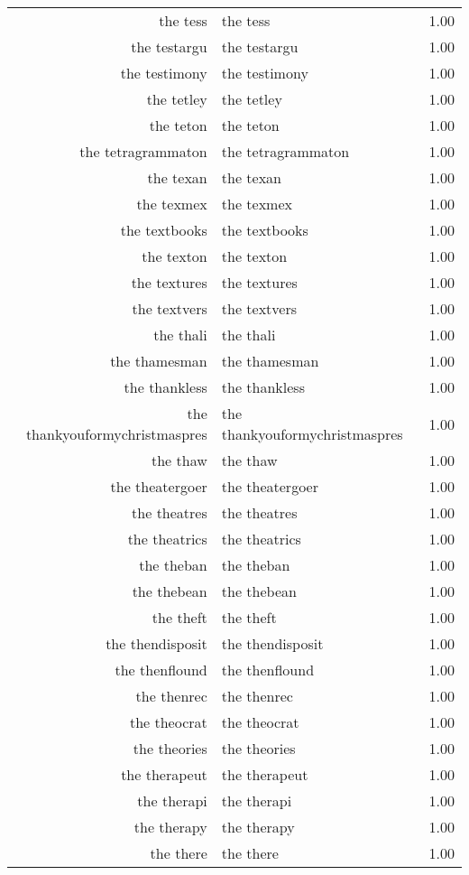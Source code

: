 \begin{table}[ht]
\begin{tabular}{rlr}
  the tess & the tess & 1.00 \\ 
  the testargu & the testargu & 1.00 \\ 
  the testimony & the testimony & 1.00 \\ 
  the tetley & the tetley & 1.00 \\ 
  the teton & the teton & 1.00 \\ 
  the tetragrammaton & the tetragrammaton & 1.00 \\ 
  the texan & the texan & 1.00 \\ 
  the texmex & the texmex & 1.00 \\ 
  the textbooks & the textbooks & 1.00 \\ 
  the texton & the texton & 1.00 \\ 
  the textures & the textures & 1.00 \\ 
  the textvers & the textvers & 1.00 \\ 
  the thali & the thali & 1.00 \\ 
  the thamesman & the thamesman & 1.00 \\ 
  the thankless & the thankless & 1.00 \\ 
  the thankyouformychristmaspres & the thankyouformychristmaspres & 1.00 \\ 
  the thaw & the thaw & 1.00 \\ 
  the theatergoer & the theatergoer & 1.00 \\ 
  the theatres & the theatres & 1.00 \\ 
  the theatrics & the theatrics & 1.00 \\ 
  the theban & the theban & 1.00 \\ 
  the thebean & the thebean & 1.00 \\ 
  the theft & the theft & 1.00 \\ 
  the thendisposit & the thendisposit & 1.00 \\ 
  the thenflound & the thenflound & 1.00 \\ 
  the thenrec & the thenrec & 1.00 \\ 
  the theocrat & the theocrat & 1.00 \\ 
  the theories & the theories & 1.00 \\ 
  the therapeut & the therapeut & 1.00 \\ 
  the therapi & the therapi & 1.00 \\ 
  the therapy & the therapy & 1.00 \\ 
  the there & the there & 1.00 \\ 

\end{tabular}
\end{table}
